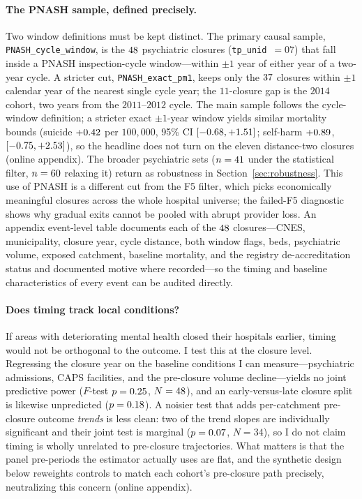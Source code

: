 \paragraph{The PNASH sample, defined precisely.} Two window definitions
must be kept distinct. The primary causal sample, \texttt{PNASH\_cycle\_window},
is the $48$ psychiatric closures (\texttt{tp\_unid}~$=07$)
that fall inside a PNASH inspection-cycle window---within $\pm 1$ year of
either year of a two-year cycle. A stricter cut, \texttt{PNASH\_exact\_pm1},
keeps only the $37$ closures within $\pm 1$ calendar
year of the nearest single cycle year; the $11$-closure gap is the $2014$
cohort, two years from the $2011$--$2012$ cycle. The main sample follows
the cycle-window definition; a stricter exact $\pm 1$-year window yields
similar mortality bounds (suicide $+0.42$ per $100{,}000$, 95\%
CI $[-0.68, +1.51]$; self-harm $+0.89$,
$[-0.75, +2.53]$), so the headline does not turn on
the eleven distance-two closures (online appendix). The broader psychiatric
sets ($n = 41$ under the statistical filter, $n =
60$ relaxing it) return as robustness in
Section~\ref{sec:robustness}. This use of PNASH is a different cut from the
F5 filter, which picks economically meaningful closures across the whole
hospital universe; the failed-F5 diagnostic shows why gradual exits cannot
be pooled with abrupt provider loss. An appendix event-level table
documents each of the $48$ closures---CNES, municipality,
closure year, cycle distance, both window flags, beds, psychiatric volume,
exposed catchment, baseline mortality, and the registry de-accreditation
status and documented motive where recorded---so the timing and baseline
characteristics of every event can be audited directly.



\paragraph{Does timing track local conditions?} If areas with
deteriorating mental health closed their hospitals earlier, timing would
not be orthogonal to the outcome. I test this at the closure level.
Regressing the closure year on the baseline conditions I can
measure---psychiatric admissions, CAPS facilities, and the pre-closure
volume decline---yields no joint predictive power ($F$-test $p =
0.25$, $N = 48$), and an early-versus-late
closure split is likewise unpredicted ($p = 0.18$). A noisier
test that adds per-catchment pre-closure outcome \emph{trends} is less
clean: two of the trend slopes are individually significant and their
joint test is marginal ($p = 0.07$, $N = 34$), so I do not
claim timing is wholly unrelated to pre-closure trajectories. What matters
is that the panel pre-periods the estimator actually uses are flat, and the
synthetic design below reweights controls to match each cohort's
pre-closure path precisely, neutralizing this concern (online appendix).


